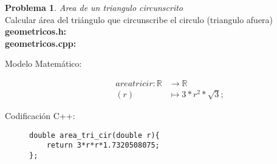 \documentclass{article}
\theoremstyle{plain}
\theoremstyle{definition}
\newtheorem{problem}{Problema}
\begin{document}
\begin{problem} \emph{Area de un triangulo circunscrito}\\
Calcular área del triángulo que circunscribe el circulo (triangulo afuera)\\
\textbf{geometricos.h:}\ \\
\textbf{geometricos.cpp:}\ 
%
\begin{description}
\item[Modelo Matemático:]
%
\begin{align*}
area tri cir: \mathbb{R} &\to \mathbb{R}\\
(r) &\mapsto 3*r^2*\sqrt{3};
\end{align*}
%
\item[Codificación \textsf{C++}:]\hfill
%
\begin{verbatim}
double area_tri_cir(double r){
    return 3*r*r*1.7320508075;
};
\end{verbatim}
\end{description}
\end{problem}
\end{document}
